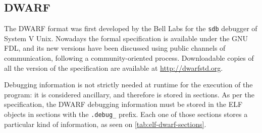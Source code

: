 \subsection{DWARF}

%
%
%
%
%	
%

The \gls{DWARF} format was first developed by the Bell Labs for the
\verb|sdb| debugger of System V Unix. Nowadays the formal specification
is available under the GNU \gls{FDL}, and its new versions have been
discussed using public channels of communication, following a
community-oriented process. Downloadable copies of all the version of
the specification are available at {\small\url{http://dwarfstd.org}}.

Debugging information is not strictly needed at runtime for the execution of
the program: it is considered ancillary, and therefore is stored in sections.
As per the specification, the DWARF debugging information must be stored in
the ELF objects in sections with the \verb|.debug_| prefix. Each one of those
sections stores a particular kind of information, as seen on
\autoref{tab:elf-dwarf-sections}.

